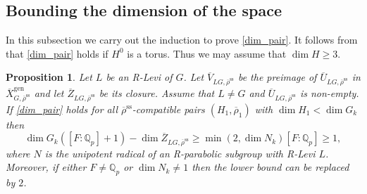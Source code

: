 \documentclass{amsart}
\newtheorem{prop}{Proposition}[section]
\theoremstyle{definition}
\theoremstyle{remark}
\newcommand{\Qp}{\mathbb {Q}_p}
\newcommand{\Zbar}{\overline{Z}}
\newcommand{\Vbar}{\overline{{V}}}
\newcommand{\rhobar}{\overline{\rho}}
\newcommand{\gen}{\mathrm{gen}}
\newcommand{\Xbar}{\overline{X}}
\newcommand{\rhobarss}{\rhobar^{\mathrm{ss}}}
\newcommand{\Ubar}{\overline{U}}
\begin{document}
\subsection{Bounding the dimension of the space}\label{bound_space} 
In this subsection we carry out the induction to prove \eqref{dim_pair}.
It follows from \cite[Theorem 9.3 (3)]{defT} that \eqref{dim_pair} holds
if $H^0$ is a torus. Thus we may assume that $\dim H\ge 3$. 

\begin{prop}\label{bound_Levi} 
    Let $L$ be an R-Levi of $G$. Let $\Vbar_{LG, \rhobarss}$ be 
    the preimage of $\Ubar_{LG, \rhobarss}$ in $\Xbar^{\gen}_{G, \rhobarss}$ and let $\Zbar_{LG, \rhobarss}$ be 
    its closure. Assume that $L\neq G$ and $\Ubar_{LG, \rhobarss}$ is non-empty.
    If \eqref{dim_pair} holds for all $\rhobarss$-compatible pairs $(H_1, \rhobar_1)$ with $\dim H_1< \dim G_k$ then
    \begin{equation}\label{eq_result}
    \dim G_k ([F:\Qp]+1) - \dim \Zbar_{LG, \rhobarss} \ge\min(2, \dim N_k) [F:\Qp]\ge 1, 
    \end{equation}
    where $N$ is the unipotent radical 
    of an R-parabolic subgroup with R-Levi $L$. Moreover, if either $F\neq \Qp$ or $\dim N_k \neq 1$
    then the lower bound can be replaced by $2$. 
\end{prop}
\end{document}

